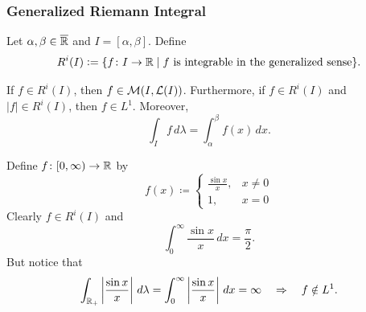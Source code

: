 \subsubsection{Generalized Riemann Integral}

Let $\alpha, \beta \in \overline{\mathbb{R}}$ and $I = [\alpha, \beta]$. Define
\[
R^i(I) \mathrel{\mathop:}= \{ f \colon I \to \mathbb{R} \mid f \text{ is integrable in the generalized sense} \}.
\]

\begin{theorem}
If $f \in R^i(I)$, then $f \in \mathcal{M}(I, \mathcal{L}(I))$. Furthermore, if $f \in R^i(I)$ and $|f| \in R^i(I)$, then $f \in L^1$. Moreover,
\[
\int_I f \, d\lambda = \int_{\alpha}^{\beta} f(x) \, dx.
\]
\end{theorem}

\begin{remark} 
Define $f \colon [0,\infty) \to \mathbb{R}$ by
\[
f(x) \coloneqq 
\begin{cases}
\frac{\sin x}{x}, & x \neq 0 \\
1, & x = 0
\end{cases}
\]
Clearly $f \in R^i(I)$ and
\[
\int_0^{\infty} \frac{\sin x}{x} \, dx = \frac{\pi}{2}.
\]
But notice that
\[
\int_{\mathbb{R}_+} \left| \frac{\sin x}{x} \right| \, d\lambda = \int_0^{\infty} \left| \frac{\sin x}{x} \right| \, dx = \infty \quad \Rightarrow \quad f \notin L^1.
\]
\end{remark}
